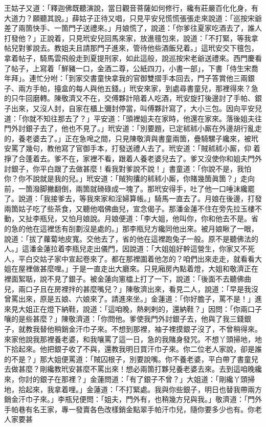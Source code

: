 王姑子又道：「釋迦佛既聽演說，當日觀音菩薩如何修行，纔有莊嚴百化化身，有大道力？願聽其說。」薛姑子正待又唱，只見平安兒慌慌張張走來說道：「巡按宋爺差了兩箇快手、一箇門子送禮來。」月娘慌了，說道：「你爹往夏家吃酒去了，誰人打發他？」正說着，只見玳安兒回馬來家，放進氊包來，說道：「不打緊，等我拿帖兒對爹說去。教姐夫且請那門子進來，管待他些酒飯兒着。」{}這玳安交下氊包，拿着帖子，騎馬雲飛般走到夏提刑家，如此這般，說巡按宋老爺送禮來。西門慶看了帖子，上寫着「鮮豬一口，金酒二尊，公紙四刀，小書一部」，下書「侍生宋喬年拜」。連忙分咐：「到家交書童快拿我的官御雙摺手本回去，門子答賞他三兩銀子、兩方手帕，擡盒的每人與他五錢。」玳安來家，到處尋書童兒，那裡得來？急的只牛回磨轉。陳敬濟又不在，交傅夥計陪着人吃酒，玳安旋打後邊討了手帕、銀子出來，又沒人封，自家在櫃上彌封停當，叫傅夥計寫了，大小三包。因向平安兒道：「你就不知往那去了？」平安道：「頭裡姐夫在家時，他還在家來。落後姐夫往門外討銀子去了，他也不見了。」玳安道：「別要題，已定秫秫小厮在外邊胡行亂走的，養老婆去了。」正在急唣之間，只見陳敬濟與書童兩箇，疊騎騾子纔來，被玳安罵了幾句，教他寫了官御手本，打發送禮人去了。玳安道：「賊秫秫小厮，仰𢵞着掙了合蓬着去。{}爹不在，家裡不看，跟着人養老婆兒去了。爹又沒使你和姐夫門外討銀子，你平白跟了去做甚麼！看我對爹說不說！」書童道：「你說不是，我怕你？你不說就是我的兒。」{}玳安道：「賊狗攮的秫秫小厮，你賭幾箇眞箇？」走向前，一箇潑脚撇翻倒，兩箇就磆碌成一塊了。那玳安得手，吐了他一口唾沫纔罷了。說道：「我接爹去，等我來家和淫婦算帳。」騎馬一直去了。月娘在後邊，打發兩箇姑子吃了些茶食，又聽他唱佛曲兒，宣念偈子。那潘金蓮不住在旁先拉玉樓不動，又扯李瓶兒，又怕月娘說。月娘便道：「李大姐，他叫你，你和他去不是。省的急的他在這裡恁有㓦劃沒是處的。」那李瓶兒方纔同他出來。被月娘瞅了一眼，說道：「拔了蘿蔔地皮寬。交他去了，省的他在這裡跑兔子一般。原不是聽佛法的人。」{}這潘金蓮拉着李瓶兒走出儀門，因說道：「大姐姐好幹這營生，你家又不死人，平白交姑子家中宣起卷來了。都在那裡圍着他怎的？咱們出來走走，就看看大姐在屋裡做甚麼哩。」于是一直走出大廳來。只見廂房內點着燈，大姐和敬濟正在裡面絮聒，說不見了銀子。被金蓮向窻櫺上打了一下，說道：「後面不去聽佛曲兒，兩口子且在房裡拌的甚麼嘴兒？」陳敬濟出來，看見二人，說道：「早是我沒曾罵出來，原是五娘、六娘來了。請進來坐。」金蓮道：「你好膽子，罵不是！」進來見大姐正在燈下納鞋，說道：「這咱晚，熱剌剌的，還納鞋？」因問：「你兩口子嚷的是些甚麼？」陳敬濟道：「你問他。爹使我門外討銀子去，他與了我三錢銀子，就教我替他稍銷金汗巾子來。不想到那裡，袖子裡摸銀子沒了，不曾稍得來。來家他說我那裡養老婆，和我嚷罵了這一日，急的我賭身發咒。不想丫頭掃地，地下拾起來。他把銀子收了不與，還教我明日買汗巾子來。{}你二位老人家說，卻是誰的不是？」那大姐便罵道：「賊囚根子，別要說嘴。你不養老婆，平白帶了書童兒去做甚麼？剛纔教玳安甚麼不罵出來！想必兩箇打夥兒養老婆去來。去到這咱晚纔來，你討的銀子在那裡？」金蓮問道：「有了銀子不曾？」大姐道：「剛纔丫頭掃地，拾起來，我拿着哩。」金蓮道：「不打緊處。我與你些銀子，明日也替我帶兩方銷金汗巾子來。」李瓶兒便問：「姐夫，門外有，也稍幾方兒與我。」敬濟道：「門外手帕巷有名王家，專一發賣各色改樣銷金點翠手帕汗巾兒，隨你要多少也有。你老人家要甚